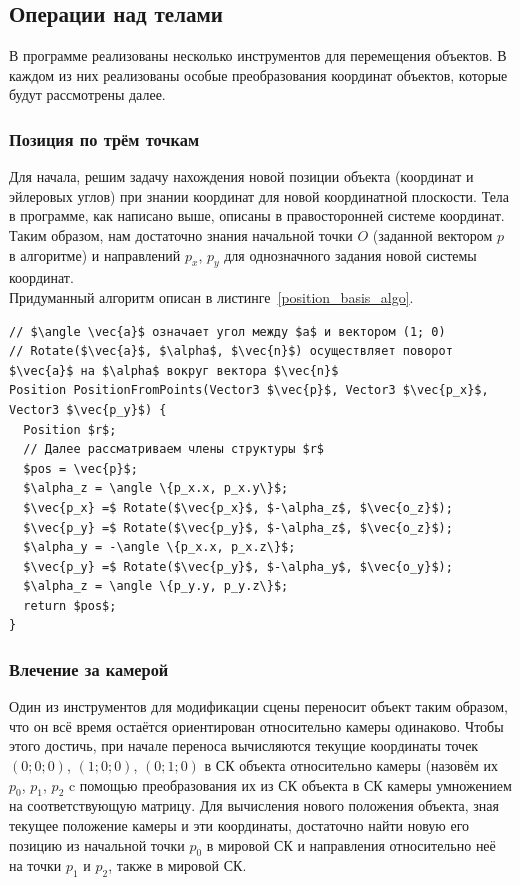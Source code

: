 \documentclass[a4paper,12pt]{report}
\numberwithin{equation}{section}
\begin{document}
\subsection{Операции над телами}
В программе реализованы несколько инструментов для перемещения объектов. В каждом из них реализованы особые преобразования координат объектов, которые будут рассмотрены далее.

\subsubsection{Позиция по трём точкам}
Для начала, решим задачу нахождения новой позиции объекта (координат и эйлеровых углов) при знании координат для новой координатной плоскости. Тела в программе, как написано выше, описаны в правосторонней системе координат. Таким образом, нам достаточно знания начальной точки $O$ (заданной вектором $p$ в алгоритме) и направлений $p_x$, $p_y$ для однозначного задания новой системы координат. \\
Придуманный алгоритм описан в листинге~\ref{position_basis_algo}.

\begin{lstlisting}[float=p,caption={Позиция по трём точкам},label=position_basis_algo]
// $\angle \vec{a}$ означает угол между $a$ и вектором (1; 0)
// Rotate($\vec{a}$, $\alpha$, $\vec{n}$) осуществляет поворот $\vec{a}$ на $\alpha$ вокруг вектора $\vec{n}$
Position PositionFromPoints(Vector3 $\vec{p}$, Vector3 $\vec{p_x}$, Vector3 $\vec{p_y}$) {
  Position $r$;
  // Далее рассматриваем члены структуры $r$
  $pos = \vec{p}$;
  $\alpha_z = \angle \{p_x.x, p_x.y\}$;
  $\vec{p_x} =$ Rotate($\vec{p_x}$, $-\alpha_z$, $\vec{o_z}$);
  $\vec{p_y} =$ Rotate($\vec{p_y}$, $-\alpha_z$, $\vec{o_z}$);
  $\alpha_y = -\angle \{p_x.x, p_x.z\}$;
  $\vec{p_y} =$ Rotate($\vec{p_y}$, $-\alpha_y$, $\vec{o_y}$);
  $\alpha_z = \angle \{p_y.y, p_y.z\}$;
  return $pos$;
}
\end{lstlisting}

\subsubsection{Влечение за камерой}
Один из инструментов для модификации сцены переносит объект таким образом, что он всё время остаётся ориентирован относительно камеры одинаково. Чтобы этого достичь, при начале переноса вычисляются текущие координаты точек $(0; 0; 0)$, $(1; 0; 0)$, $(0; 1; 0)$ в СК объекта относительно камеры (назовём их $p_0$, $p_1$, $p_2$ c помощью преобразования их из СК объекта в СК камеры умножением на соответствующую матрицу. Для вычисления нового положения объекта, зная текущее положение камеры и эти координаты, достаточно найти новую его позицию из начальной точки $p_0$ в мировой СК и направления относительно неё на точки $p_1$ и $p_2$, также в мировой СК.
\end{document}
